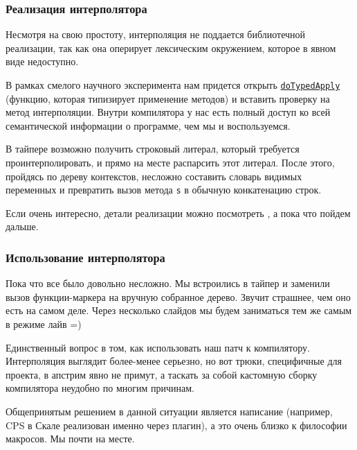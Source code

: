 \documentclass[hyperref={bookmarks=false}]{beamer}
\begin{document}
\begin{frame}[t,fragile]
\frametitle{Реализация интерполятора}

Несмотря на свою простоту, интерполяция не поддается библиотечной реализации, так как она оперирует лексическим окружением, которое в явном виде недоступно.

В рамках смелого научного эксперимента нам придется открыть \texttt{\color{red}\href{TODO!}{doTypedApply}} (функцию, которая типизирует применение методов) и вставить проверку на метод интерполяции. Внутри компилятора у нас есть полный доступ ко всей семантической информации о программе, чем мы и воспользуемся.

В тайпере возможно получить строковый литерал, который требуется проинтерполировать, и прямо на месте распарсить этот литерал. После этого, пройдясь по дереву контекстов, несложно составить словарь видимых переменных и превратить вызов метода \texttt{s} в обычную конкатенацию строк.

Если очень интересно, детали реализации можно посмотреть , а пока что пойдем дальше.
\end{frame}

\begin{frame}[t,fragile]
\frametitle{Использование интерполятора}

Пока что все было довольно несложно. Мы встроились в тайпер и заменили вызов функции-маркера на вручную собранное дерево. Звучит страшнее, чем оно есть на самом деле. Через несколько слайдов мы будем заниматься тем же самым в режиме лайв =)

Единственный вопрос в том, как использовать наш патч к компилятору. Интерполяция выглядит более-менее серьезно, но вот трюки, специфичные для проекта, в апстрим явно не примут, а таскать за собой кастомную сборку компилятора неудобно по многим причинам.

Общепринятым решением в данной ситуации является написание  (например, CPS в Скале реализован именно через плагин), а это очень близко к философии макросов. Мы почти на месте.
\end{frame}
\end{document}

